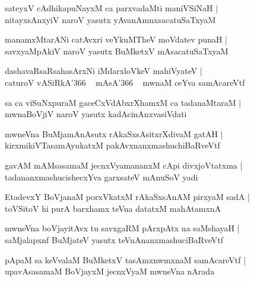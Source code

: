 \documentclass[twoside,12pt,openright]{book}
\newcounter{shloka}[chapter]
\begin{document}
\begin{shloka}%
sateyxV cAdhikapuNayxM ca parxvadaMti maniVSiNaH |\\
nitayxsAnxyiV naroV yasutx yAvanAmnxsacatuSaTxyaM 
\end{shloka}

\begin{shloka}%
manamxMtarANi catAvxri veYkuMTheV moVdatev punaH |\\
savxyaMpAkiV naroV yasutx BuMketxV mAsacatuSaTxyaM 
\end{shloka}

\begin{shloka}%
dashavaRsaRsahasArxNi iMdarxloVkeV mahiVyateV |\\
caturoV vASiRkA\char'366 ~ mAsA\char'366 ~ mwnaM ceYva samAcareVtf
\end{shloka}

\begin{shloka}%
sa ca viSuNxpuraM gaceCxVdAbxrXhamxM ca tadanaMtaraM |\\
mwnaBoVjiV naroV yasutx kadAcinAnxvasiVdati
\end{shloka}

\begin{shloka}%
mwneVna BuMjamAnAsutx rAkaSxsAsitxrXdivaM gatAH |\\
kirxmikiVTasamAyukatxM pakAvxnanxmashuchiBaRveVtf
\end{shloka}

\begin{shloka}%
gavAM mAMsasamaM jecnxVyamananxM cApi divxjoVtatxma |\\
tadananxmashucishecxYva garxsateV mAnuSoV yadi
\end{shloka}

\begin{shloka}%
EtadevxY BoVjanaM porxVkatxM rAkaSxsAnAM pirxyaM sadA |\\
toVSitoV hi purA barxhamx teVna datatxM mahAtamxnA
\end{shloka}

\begin{shloka}%
mwneVna boVjayitAvx tu savxgaRM pArxpAtx na saMshayaH |\\
saMjalapxnf BuMjateV yasutx teVnAnanxmashuciBaRveVtf
\end{shloka}

\begin{shloka}%
pApaM sa keVvalaM BuMketxV tasAmxnwmxnaM samAcareVtf |\\
upavAsasamaM BoVjayxM jecnxVyaM mwneVna nArada
\end{shloka}
\end{document}
